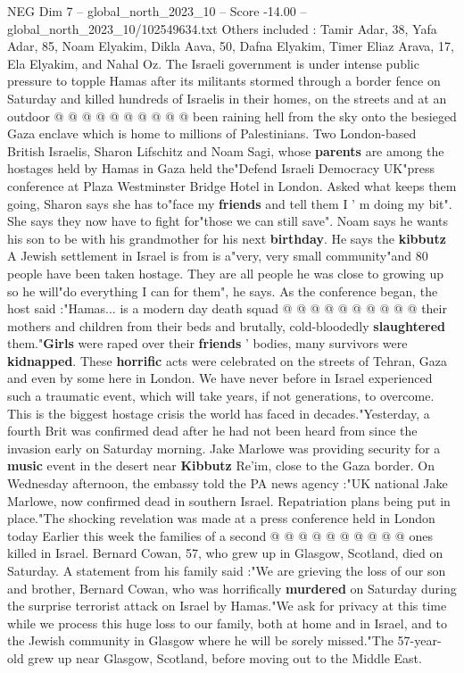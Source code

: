 \begin{textsample}{NEG Dim 7 – global\_north\_2023\_10 – Score -14.00 – global\_north\_2023\_10/102549634.txt}
Others included : Tamir Adar, 38, Yafa Adar, 85, Noam Elyakim, Dikla Aava, 50, Dafna Elyakim, Timer Eliaz Arava, 17, Ela Elyakim, and Nahal Oz.
The Israeli government is under intense public pressure to topple Hamas after its militants stormed through a border fence on Saturday and killed hundreds of Israelis in their homes, on the streets and at an outdoor @ @ @ @ @ @ @ @ @ @ been raining hell from the sky onto the besieged Gaza enclave which is home to millions of Palestinians.
Two London-based British Israelis, Sharon Lifschitz and Noam Sagi, whose \textbf{parents} are among the hostages held by Hamas in Gaza held the"Defend Israeli Democracy UK"press conference at Plaza Westminster Bridge Hotel in London.
Asked what keeps them going, Sharon says she has to"face my \textbf{friends} and tell them I ' m doing my bit".
She says they now have to fight for"those we can still save".
Noam says he wants his son to be with his grandmother for his next \textbf{birthday}.
He says the \textbf{kibbutz} A Jewish settlement in Israel is from is a"very, very small community"and 80 people have been taken hostage.
They are all people he was close to growing up so he will"do everything I can for them", he says.
As the conference began, the host said :"Hamas... is a modern day death squad @ @ @ @ @ @ @ @ @ @ their mothers and children from their beds and brutally, cold-bloodedly \textbf{slaughtered} them."\textbf{Girls} were raped over their \textbf{friends} ' bodies, many survivors were \textbf{kidnapped}.
These \textbf{horrific} acts were celebrated on the streets of Tehran, Gaza and even by some here in London.
We have never before in Israel experienced such a traumatic event, which will take years, if not generations, to overcome.
This is the biggest hostage crisis the world has faced in decades."Yesterday, a fourth Brit was confirmed dead after he had not been heard from since the invasion early on Saturday morning.
Jake Marlowe was providing security for a \textbf{music} event in the desert near \textbf{Kibbutz} Re'im, close to the Gaza border.
On Wednesday afternoon, the embassy told the PA news agency :"UK national Jake Marlowe, now confirmed dead in southern Israel.
Repatriation plans being put in place."The shocking revelation was made at a press conference held in London today Earlier this week the families of a second @ @ @ @ @ @ @ @ @ @ ones killed in Israel.
Bernard Cowan, 57, who grew up in Glasgow, Scotland, died on Saturday.
A statement from his family said :"We are grieving the loss of our son and brother, Bernard Cowan, who was horrifically \textbf{murdered} on Saturday during the surprise terrorist attack on Israel by Hamas."We ask for privacy at this time while we process this huge loss to our family, both at home and in Israel, and to the Jewish community in Glasgow where he will be sorely missed."The 57-year-old grew up near Glasgow, Scotland, before moving out to the Middle East.

\end{textsample}
